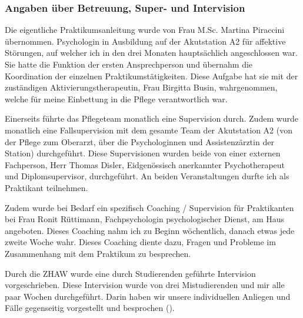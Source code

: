 \documentclass[jou,apacite]{apa6}
\begin{document}
\subsubsection{Angaben über Betreuung, Super- und Intervision}
Die eigentliche Praktikumsanleitung wurde von Frau M.Sc. Martina Piraccini übernommen. Psychologin in Ausbildung auf der Akutstation A2 für affektive Störungen, auf welcher ich in den drei Monaten hauptsächlich angeschlossen war. Sie hatte die Funktion der ersten Ansprechperson und übernahm die Koordination der einzelnen Praktikumstätigkeiten. Diese Aufgabe hat sie mit der zuständigen Aktivierungstherapeutin, Frau Birgitta Busin, wahrgenommen, welche für meine Einbettung in die Pflege verantwortlich war. 

Einerseits führte das Pflegeteam monatlich eine Supervision durch. Zudem wurde monatlich eine Fallsupervision mit dem gesamte Team der Akutstation A2 (von der Pflege zum Oberarzt, über die Psychologinnen und Assistenzärztin der Station) durchgeführt. Diese Supervisionen wurden beide von einer externen Fachperson, Herr Thomas Disler, Eidgenössisch anerkannter Psychotherapeut und Diplomsupervisor, durchgeführt. An beiden Veranstaltungen durfte ich als Praktikant teilnehmen. 

Zudem wurde bei Bedarf ein spezifisch Coaching / Supervision für Praktikanten bei Frau Ronit Rüttimann, Fachpsychologin psychologischer Dienst, am Haus angeboten. Dieses Coaching nahm ich zu Beginn wöchentlich, danach etwas jede zweite Woche wahr. Dieses Coaching diente dazu, Fragen und Probleme im Zusammenhang mit dem Praktikum zu besprechen.

Durch die ZHAW wurde eine durch Studierenden geführte Intervision vorgeschrieben. Diese Intervision wurde von drei Mistudierenden und mir alle paar Wochen durchgeführt. Darin haben wir unsere individuellen Anliegen und Fälle gegenseitig vorgestellt und besprochen (). 

\end{document}
